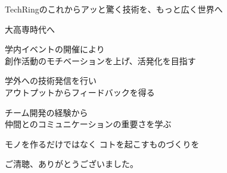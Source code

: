 \documentclass[dvipdfmx]{beamer}
\begin{document}
\begin{frame}{TechRingのこれから}{アッと驚く技術を、もっと広く世界へ}

  \vspace{-5mm}

  \begin{block}{大高専時代へ}
    \vspace{2mm}
    \begin{description}
      \setlength{\itemsep}{2mm}
      \item[創造の意欲] 学内イベントの開催により\\
      創作活動のモチベーションを上げ、活発化を目指す
      \item[幅広い視野] 学外への技術発信を行い\\
      アウトプットからフィードバックを得る
      \item[自律と友愛] チーム開発の経験から\\
      仲間とのコミュニケーションの重要さを学ぶ
    \end{description}
  \end{block}

  \vfill

  \begin{Large}
    モノを作るだけではなく \vfill \hspace{7em}\alert{コトを起こす}ものづくりを
  \end{Large}
\end{frame}

\begin{frame}
  \begin{center}
    \begin{Large}
      ご清聴、ありがとうございました。
    \end{Large}
  \end{center}
\end{frame}
\end{document}
